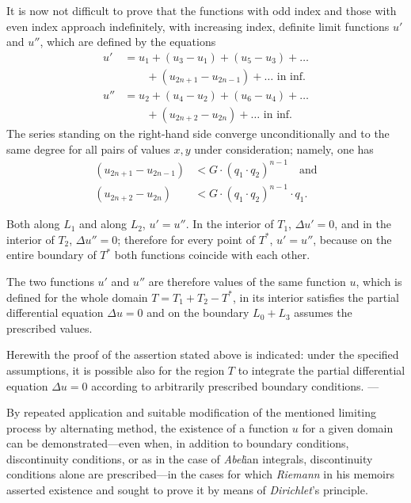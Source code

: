 \documentclass{article}
\begin{document}
It is now not difficult to prove that the functions with odd index and those with even index approach indefinitely, with increasing index, definite limit functions $u'$ and $u''$, which are defined by the equations
\[
\begin{aligned}
u' &= u_1 + (u_3 - u_1) + (u_5 - u_3) + \dots \\
   &\qquad + (u_{2n+1} - u_{2n-1}) + \dots \text{ in inf.} \\
u'' &= u_2 + (u_4 - u_2) + (u_6 - u_4) + \dots \\
   &\qquad + (u_{2n+2} - u_{2n}) + \dots \text{ in inf.}
\end{aligned}
\]
The series standing on the right-hand side converge unconditionally and to the same degree for all pairs of values $x, y$ under consideration; namely, one has
\[
\begin{aligned}
(u_{2n+1} - u_{2n-1}) & < G \cdot (q_1 \cdot q_2)^{n-1} \quad\text{and}\\
(u_{2n+2} - u_{2n}) & < G \cdot (q_1 \cdot q_2)^{n-1} \cdot q_1.
\end{aligned}
\]

Both along $L_1$ and along $L_2$, $u' = u''$. In the interior of $T_1$, $\Delta u' = 0$, and in the interior of $T_2$, $\Delta u'' = 0$; therefore for every point of $T^*$, $u' = u''$, because on the entire boundary of $T^*$ both functions coincide with each other.

The two functions $u'$ and $u''$ are therefore values of the same function $u$, which is defined for the whole domain $T = T_1 + T_2 - T^*$, in its interior satisfies the partial differential equation $\Delta u = 0$
and on the boundary $L_0 + L_3$ assumes the prescribed values.

Herewith the proof of the assertion stated above is indicated: under the specified assumptions, it is possible also for the region $T$ to integrate the partial differential equation $\Delta u = 0$ according to arbitrarily prescribed boundary conditions. ---

By repeated application and suitable modification of the mentioned limiting process by alternating method, the existence of a function $u$ for a given domain can be demonstrated---even when, in addition to boundary conditions, discontinuity conditions, or as in the case of \emph{Abel}ian integrals, discontinuity conditions alone are prescribed---in the cases for which \emph{Riemann} in his memoirs asserted existence and sought to prove it by means of \emph{Dirichlet}'s principle.
\end{document}
